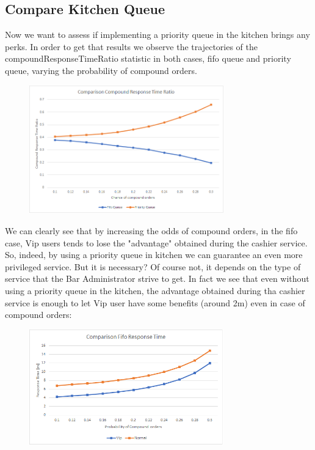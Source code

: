 \subsection{Compare Kitchen Queue}

Now we want to assess if implementing a priority queue in the kitchen brings any perks. In order to get that results we observe the trajectories of the compoundResponseTimeRatio statistic in both cases, fifo queue and priority queue, varying the probability of compound orders.

\begin{figure}[H]
    \centering
    \includegraphics[width=0.75\textwidth]{figs/comparisonQueue.png}
\end{figure}

We can clearly see that by increasing the odds of compound orders, in the fifo case, Vip users tends to lose the "advantage" obtained during the cashier service. So, indeed, by using a priority queue in kitchen we can guarantee an even more privileged service. But it is necessary? Of course not, it depends on the type of service that the Bar Administrator strive to get. In fact we see that even without using a priority queue in the kitchen, the advantage obtained during tha cashier service is enough to let Vip user have some benefits (around 2m) even in case of compound orders:

\begin{figure}[H]
    \centering
    \includegraphics[width=0.75\textwidth]{figs/comparisonFifoKitchen.png}
\end{figure}

